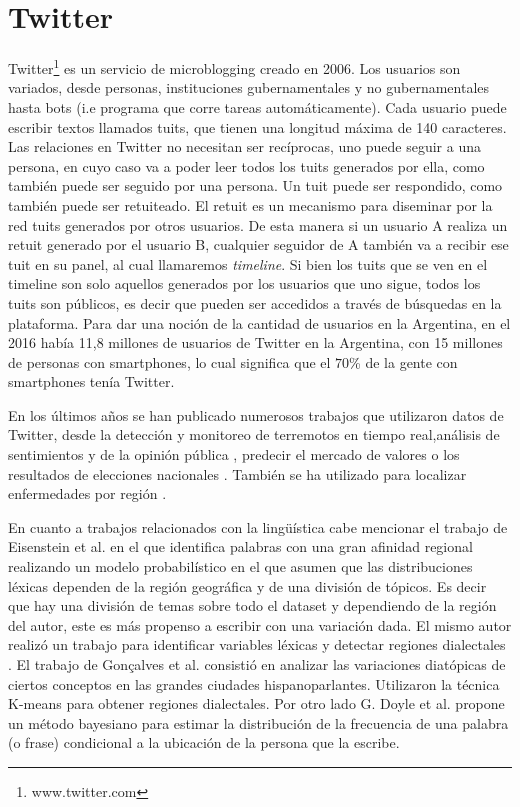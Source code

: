 \section{Twitter}
Twitter\footnote{www.twitter.com} es un servicio de microblogging creado en 2006. Los usuarios son variados, desde personas, instituciones gubernamentales y no gubernamentales hasta bots (i.e programa que corre tareas automáticamente). Cada usuario puede escribir textos llamados tuits, que tienen una longitud máxima de 140 caracteres. Las relaciones en Twitter no necesitan ser recíprocas, uno puede seguir a una persona, en cuyo caso va a poder leer todos los tuits generados por ella, como también puede ser seguido por una persona. Un tuit puede ser respondido, como también puede ser retuiteado. El retuit es un mecanismo para diseminar por la red tuits generados por otros usuarios. De esta manera si un usuario A realiza un retuit generado por el usuario B, cualquier seguidor de A también va a recibir ese tuit en su panel, al cual llamaremos \textit{timeline}. Si bien los tuits que se ven en el timeline son solo aquellos generados por los usuarios que uno sigue, todos los tuits son públicos, es decir que pueden ser accedidos a través de búsquedas en la plataforma.
Para dar una noción de la cantidad de usuarios en la Argentina, en el 2016 había 11,8 millones de usuarios de Twitter en la Argentina, con 15 millones de personas con smartphones, lo cual significa que el $70$\% de la gente con smartphones tenía Twitter.%

En los últimos años se han publicado numerosos trabajos que utilizaron datos de Twitter, desde la detección y monitoreo de terremotos en tiempo real\cite{sakaki2010earthquake},análisis de sentimientos y de la opinión pública \cite{liu2012sentiment},  predecir el mercado de valores \cite{pak2010twitter} o los resultados de elecciones nacionales \cite{tumasjan2010predicting}. También se ha utilizado para localizar enfermedades por región \cite{paul2011you}.

En cuanto a trabajos relacionados con la lingüística cabe mencionar el trabajo de Eisenstein et al. \cite{eisenstein2010latent} en el que identifica palabras con una gran afinidad regional realizando un modelo probabilístico en el que asumen que las distribuciones léxicas dependen de la región geográfica y de una división de tópicos. Es decir que hay una división de temas sobre todo el dataset y dependiendo de la región del autor, este es más propenso a escribir con una variación dada. El mismo autor realizó un trabajo para identificar variables léxicas y detectar regiones dialectales \cite{eisenstein2014identifying}.
El trabajo de Gonçalves et al. \cite{gonccalves2014crowdsourcing} consistió en analizar las variaciones diatópicas de ciertos conceptos en las grandes ciudades hispanoparlantes. Utilizaron la técnica K-means \cite{bishop2006pattern} para obtener regiones dialectales. Por otro lado G. Doyle et al. \cite{doyle2014mapping} propone un método bayesiano para estimar la distribución de la frecuencia de una palabra (o frase) condicional a la ubicación de la persona que la escribe. 

